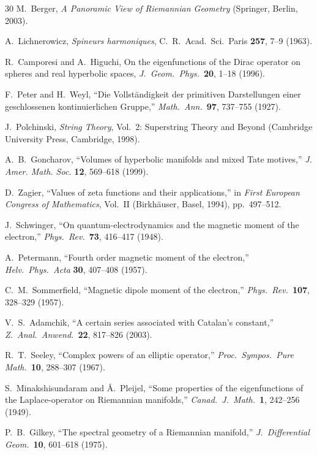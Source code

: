 \documentclass[aps,pra,twocolumn,superscriptaddress,longbibliography]{revtex4-2}
\begin{document}
\begin{thebibliography}{30}
M.~Berger,
\textit{A Panoramic View of Riemannian Geometry}
(Springer, Berlin, 2003).

A.~Lichnerowicz,
\textit{Spineurs harmoniques},
C.~R.\ Acad.\ Sci.\ Paris \textbf{257}, 7--9 (1963).

R.~Camporesi and A.~Higuchi,
On the eigenfunctions of the Dirac operator on spheres and
real hyperbolic spaces,
\textit{J.\ Geom.\ Phys.}\ \textbf{20}, 1--18 (1996).

F.~Peter and H.~Weyl,
``Die Vollst\"andigkeit der primitiven Darstellungen einer
geschlossenen kontinuierlichen Gruppe,''
\textit{Math.\ Ann.}\ \textbf{97}, 737--755 (1927).

J.~Polchinski,
\textit{String Theory}, Vol.~2: Superstring Theory and Beyond
(Cambridge University Press, Cambridge, 1998).

A.~B.~Goncharov,
``Volumes of hyperbolic manifolds and mixed Tate motives,''
\textit{J. Amer. Math. Soc.} \textbf{12}, 569--618 (1999).

D.~Zagier,
``Values of zeta functions and their applications,''
in \textit{First European Congress of Mathematics}, Vol.~II
(Birkh\"auser, Basel, 1994), pp.~497--512.

J.~Schwinger,
``On quantum-electrodynamics and the magnetic moment of the electron,''
\textit{Phys.\ Rev.}\ \textbf{73}, 416--417 (1948).

A.~Petermann,
``Fourth order magnetic moment of the electron,''
\textit{Helv.\ Phys.\ Acta} \textbf{30}, 407--408 (1957).

C.~M.~Sommerfield,
``Magnetic dipole moment of the electron,''
\textit{Phys.\ Rev.}\ \textbf{107}, 328--329 (1957).

V.~S.~Adamchik,
``A certain series associated with Catalan's constant,''
\textit{Z.\ Anal.\ Anwend.}\ \textbf{22}, 817--826 (2003).

R.~T.~Seeley,
``Complex powers of an elliptic operator,''
\textit{Proc.\ Sympos.\ Pure Math.}\ \textbf{10}, 288--307 (1967).

S.~Minakshisundaram and {\AA}.~Pleijel,
``Some properties of the eigenfunctions of the Laplace-operator
on Riemannian manifolds,''
\textit{Canad.\ J.\ Math.}\ \textbf{1}, 242--256 (1949).

P.~B.~Gilkey,
``The spectral geometry of a Riemannian manifold,''
\textit{J.\ Differential Geom.}\ \textbf{10}, 601--618 (1975).

\end{thebibliography}
\end{document}
